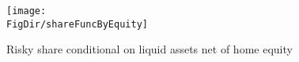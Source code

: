\begin{figure}[h]
	\centering
	\texttt{[image: \\FigDir/shareFuncByEquity]}
	\caption{Risky share conditional on liquid assets net of home equity}
	\label{fig:shareFuncByEquity}
\end{figure}
